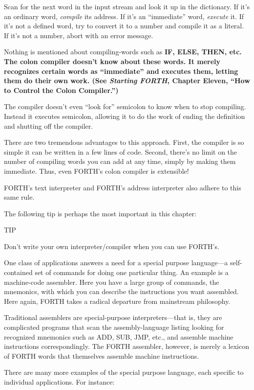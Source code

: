 Scan for the next word in the input stream and look it up in the dictionary.
If it's an ordinary word, \emph{compile} its address.
If it's an ``immediate'' word, \emph{execute} it.
If it's not a defined word, try to convert it to a number and compile it as a
literal.
If it's not a number, abort with an error message.

Nothing is mentioned about compiling-words such as \bf{IF}, \bf{ELSE},
\bf{THEN}, etc. The colon compiler doesn't know about these words. It merely
recognizes certain words as ``immediate'' and executes them, letting
them do their own work. (See \emph{Starting FORTH}, Chapter Eleven, ``How to
Control the Colon Compiler.'')

The compiler doesn't even ``look for'' semicolon to know when to
stop compiling. Instead it executes semicolon, allowing it to do the work
of ending the definition and shutting off the compiler.

There are two tremendous advantages to this approach. First, the
compiler is so simple it can be written in a few lines of code. Second,
there's no limit on the number of compiling words you can add at any
time, simply by making them immediate. Thus, even FORTH's colon
compiler is extensible!

FORTH's text interpreter and FORTH's address interpreter also
adhere to this same rule.

The following tip is perhaps the most important in this chapter:

TIP

Don't write your own interpreter/compiler when you can use FORTH's.

One class of applications answers a need for a special purpose
language---a self-contained set of commands for doing one particular
thing. An example is a machine-code assembler. Here you have a large
group of commands, the mnemonics, with which you can describe the
instructions you want assembled. Here again, FORTH takes a radical
departure from mainstream philosophy.

Traditional assemblers are special-purpose interpreters---that is,
they are complicated programs that scan the assembly-language listing
looking for recognized mnemonics such as ADD, SUB, JMP, etc., and
assemble machine instructions correspondingly. The FORTH assembler,
however, is merely a lexicon of FORTH words that themselves assemble
machine instructions.

There are many more examples of the special purpose language,
each specific to individual applications. For instance:

